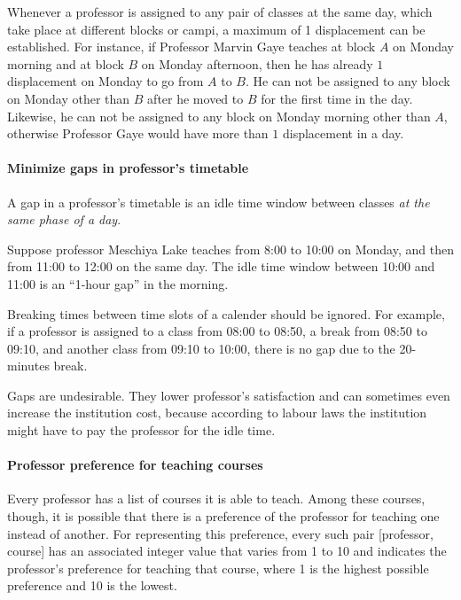 Whenever a professor is assigned to any pair of classes at the same day, which take place at different blocks or campi, a maximum of 1 displacement can be established. For instance, if Professor Marvin Gaye teaches at block $A$ on Monday morning and at block $B$ on Monday afternoon, then he has already $1$ displacement on Monday to go from $A$ to $B$. He can not be assigned to any block on Monday other than $B$ after he moved to $B$ for the first time in the day. Likewise, he can not be assigned to any block on Monday morning other than $A$, otherwise Professor Gaye would have more than $1$ displacement in a day.



\paragraph{Minimize gaps in professor's timetable}
\label{constrmingapprof}

A gap in a professor's timetable is an idle time window between classes \textit{at the same phase of a day}.

Suppose professor Meschiya Lake teaches from 8:00 to 10:00 on Monday, and then from 11:00 to 12:00 on the same day. The idle time window between 10:00 and 11:00 is an ``1-hour gap'' in the morning.

Breaking times between time slots of a calender should be ignored. For example, if a professor is assigned to a class from 08:00 to 08:50, a break from 08:50 to 09:10, and another class from 09:10 to 10:00, there is no gap due to the 20-minutes break.

Gaps are undesirable. They lower professor's satisfaction and can sometimes even increase the institution cost, because according to labour laws the institution might have to pay the professor for the idle time.



\paragraph{Professor preference for teaching courses}
\label{constrprefercourse}

Every professor has a list of courses it is able to teach. Among these courses, though, it is possible that there is a preference of the professor for teaching one instead of another. For representing this preference, every such pair [professor, course] has an associated integer value that varies from 1 to 10 and indicates the professor's preference for teaching that course, where 1 is the highest possible preference and 10 is the lowest.

